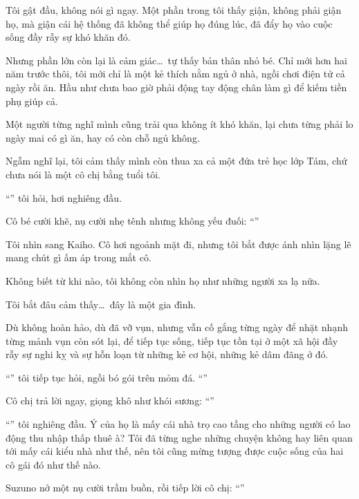 \documentclass[../main.tex]{subfiles}
\begin{document}
Tôi gật đầu, không nói gì ngay. Một phần trong tôi thấy giận, không phải giận họ, mà giận cái hệ thống đã không thể giúp họ đúng lúc, đã đẩy họ vào cuộc sống đầy rẫy sự khó khăn đó.

Nhưng phần lớn còn lại là cảm giác\dots\ tự thấy bản thân nhỏ bé. Chỉ mới hơn hai năm trước thôi, tôi mới chỉ là một kẻ thích nằm ngủ ở nhà, ngồi chơi điện tử cả ngày rồi ăn. Hầu như chưa bao giờ phải động tay động chân làm gì để kiếm tiền phụ giúp cả.

Một người từng nghĩ mình cũng trải qua không ít khó khăn, lại chưa từng phải lo ngày mai có gì ăn, hay có còn chỗ ngủ không.

Ngẫm nghĩ lại, tôi cảm thấy mình còn thua xa cả một đứa trẻ học lớp Tám, chứ chưa nói là một cô chị bằng tuổi tôi.

``'' tôi hỏi, hơi nghiêng đầu.

Cô bé cười khẽ, nụ cười nhẹ tênh nhưng không yếu đuối: ``''

Tôi nhìn sang Kaiho. Cô hơi ngoảnh mặt đi, nhưng tôi bắt được ánh nhìn lặng lẽ mang chút gì ấm áp trong mắt cô.

Không biết từ khi nào, tôi không còn nhìn họ như những người xa lạ nữa.

Tôi bắt đâu cảm thấy\dots\ đây là một gia đình.

Dù không hoàn hảo, dù đã vỡ vụn, nhưng vẫn cố gắng từng ngày để nhặt nhạnh từng mảnh vụn còn sót lại, để tiếp tục sống, tiếp tục tồn tại ở một xã hội đầy rẫy sự nghi kỵ và sự hỗn loạn từ những kẻ cơ hội, những kẻ dâm đãng ở đó.

``'' tôi tiếp tục hỏi, ngồi bó gói trên mỏm đá. ``''

Cô chị trả lời ngay, giọng khô như khói sương: ``''

``'' tôi nghiêng đầu. Ý của họ là mấy cái nhà trọ cao tầng cho những người có lao động thu nhập thấp thuê à? Tôi đã từng nghe những chuyện không hay liên quan tới mấy cái kiểu nhà như thế, nên tôi cũng mừng tượng được cuộc sống của hai cô gái đó như thế nào.

Suzuno nở một nụ cười trầm buồn, rồi tiếp lời cô chị: ``''
\end{document}
